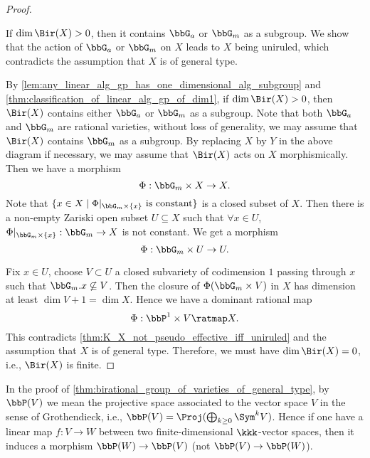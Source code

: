 \begin{proof}
        \begin{step}\label{step_in_thm:birational_group_of_varieties_of_general_type:Bir_X_is_finite}
            If \(\dim \Bir(X) > 0\), then it contains \(\bbG_a\) or \(\bbG_m\) as a subgroup.
            We show that the action of \(\bbG_a\) or \(\bbG_m\) on \(X\) leads to \(X\) being uniruled, which contradicts the assumption that \(X\) is of general type.
        \end{step}

        By \cref{lem:any_linear_alg_gp_has_one_dimensional_alg_subgroup} and \cref{thm:classification_of_linear_alg_gp_of_dim1}, if \(\dim \Bir(X) > 0\), then \(\Bir(X)\) contains either \(\bbG_a\) or \(\bbG_m\) as a subgroup.
        Note that both \(\bbG_a\) and \(\bbG_m\) are rational varieties, without loss of generality, we may assume that \(\Bir(X)\) contains \(\bbG_m\) as a subgroup.
        By replacing \(X\) by \(Y\) in the above diagram if necessary, we may assume that \(\Bir(X)\) acts on \(X\) morphismically.
        Then we have a morphism
        \[ \Phi: \bbG_m \times X \to X. \]
        Note that \(\{x \in X \mid \Phi|_{\bbG_m \times \{x\}} \text{ is constant}\}\) is a closed subset of \(X\).
        Then there is a non-empty Zariski open subset \(U \subseteq X\) such that \(\forall x \in U\), \(\Phi|_{\bbG_m \times \{x\}}: \bbG_m \to X\) is not constant.
        We get a morphism
        \[ \Phi: \bbG_m \times U \to U. \]

        Fix \(x \in U\), choose \(V \subset U\) a closed subvariety of codimension \(1\) passing through \(x\) such that \(\bbG_m.x \not\subseteq V\).
        Then the closure of \(\Phi(\bbG_m \times V)\) in \(X\) has dimension at least \(\dim V + 1 = \dim X\).
        Hence we have a dominant rational map
        \[ \Phi: \bbP^1 \times V \ratmap X. \]
        This contradicts \cref{thm:K_X_not_pseudo_effective_iff_uniruled} and the assumption that \(X\) is of general type.
        Therefore, we must have \(\dim \Bir(X) = 0\), i.e., \(\Bir(X)\) is finite.
    \end{proof}

    \begin{remark}\label{rmk_on_finite_birational_group_of_general_type:projection_in_the_sense_of_Grothendieck_and_its_dual}
        In the proof of \cref{thm:birational_group_of_varieties_of_general_type}, by \(\bbP(V)\) we mean the projective space associated to the vector space \(V\) in the sense of Grothendieck, i.e., \(\bbP(V) = \Proj(\bigoplus_{k \geq 0} \Sym^k V)\).
        Hence if one have a linear map \(f: V \to W\) between two finite-dimensional \(\kkk\)-vector spaces, then it induces a morphism \(\bbP(W) \to \bbP(V)\) (not \(\bbP(V) \to \bbP(W)\)).
    \end{remark}

